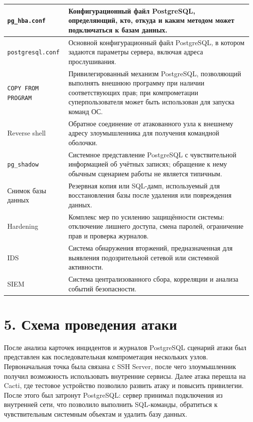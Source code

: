 \documentclass[14pt]{extarticle}
\begin{document}
\begin{longtable}{|p{4.2cm}|p{10.2cm}|}
\hline
\texttt{pg\_hba.conf} & Конфигурационный файл PostgreSQL, определяющий, кто, откуда и каким методом может подключаться к базам данных. \\
\hline
\texttt{postgresql.conf} & Основной конфигурационный файл PostgreSQL, в котором задаются параметры сервера, включая адреса прослушивания. \\
\hline
\texttt{COPY FROM PROGRAM} & Привилегированный механизм PostgreSQL, позволяющий выполнять внешнюю программу при наличии соответствующих прав; при компрометации суперпользователя может быть использован для запуска команд ОС. \\
\hline
Reverse shell & Обратное соединение от атакованного узла к внешнему адресу злоумышленника для получения командной оболочки. \\
\hline
\texttt{pg\_shadow} & Системное представление PostgreSQL с чувствительной информацией об учётных записях; обращение к нему обычным сценарием работы не является типичным. \\
\hline
Снимок базы данных & Резервная копия или SQL-дамп, используемый для восстановления базы после удаления или повреждения данных. \\
\hline
Hardening & Комплекс мер по усилению защищённости системы: отключение лишнего доступа, смена паролей, ограничение прав и проверка журналов. \\
\hline
IDS & Система обнаружения вторжений, предназначенная для выявления подозрительной сетевой или системной активности. \\
\hline
SIEM & Система централизованного сбора, корреляции и анализа событий безопасности. \\
\hline
\end{longtable}

\clearpage

\section*{5. Схема проведения атаки}

После анализа карточек инцидентов и журналов PostgreSQL сценарий атаки был представлен как последовательная компрометация нескольких узлов. Первоначальная точка была связана с SSH Server, после чего злоумышленник получил возможность использовать внутренние сервисы. Далее атака перешла на Cacti, где тестовое устройство позволило развить атаку и повысить привилегии. После этого был затронут PostgreSQL: сервер принимал подключения из внутренней сети, что позволило выполнить SQL-команды, обратиться к чувствительным системным объектам и удалить базу данных.
\end{document}
